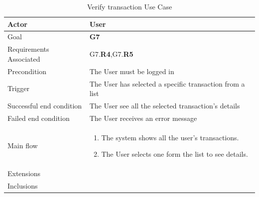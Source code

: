 \newline
\begin{table}[htb]
\begin{center}
\renewcommand{\arraystretch}{1.5}
\begin{tabular}{|l|p{}|}
\hline
Actor & User \\ \hline
Goal & \textbf{G7} \\ \hline
Requirements Associated & G7.\textbf{R4},G7.\textbf{R5} \\ \hline
Precondition & The User must be logged in \\ \hline
Trigger & The User has selected a specific transaction from a list \\ \hline
Successful end condition & The User see all the selected transaction's details \\ \hline
Failed end condition & The User receives an error message \\ \hline
Main flow & \begin{minipage}[t]{0.6\textwidth}
\begin{enumerate}
\addtolength{\itemindent}{0.5cm}
\item The system shows all the user's transactions.
\item The User selects one form the list to see details.
\vspace{2,5mm}
\end{enumerate}
\end{minipage} \\ \hline
Extensions & \\ \hline
Inclusions &  \\ \hline
\end{tabular}
\caption{Verify transaction Use Case}
\end{center}
\end{table}
\clearpage

